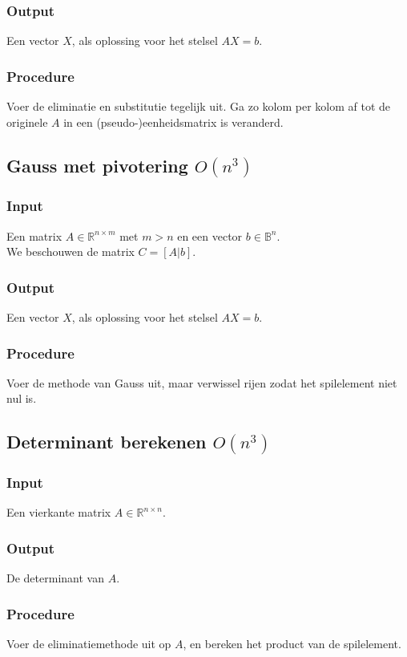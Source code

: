 \documentclass[samenvatting.tex]{subfiles}
\begin{document}
\subsubsection*{Output}
Een vector $X$, als oplossing voor het stelsel $AX=b$.
\subsubsection*{Procedure}
Voer de eliminatie en substitutie tegelijk uit. Ga zo kolom per kolom af tot de originele $A$ in een (pseudo-)eenheidsmatrix is veranderd.

\subsection{Gauss met pivotering $O(n^3)$}
\subsubsection*{Input}
Een matrix $A \in \mathbb{R}^{n\times m}$ met $m>n$ en een vector $b \in \mathbb{B}^{n}$.\\
We beschouwen de matrix $C = [A|b]$.
\subsubsection*{Output}
Een vector $X$, als oplossing voor het stelsel $AX=b$.
\subsubsection*{Procedure}
Voer de methode van Gauss uit, maar verwissel rijen zodat het spilelement niet nul is.

\subsection{Determinant berekenen $O(n^3)$}
\subsubsection*{Input}
Een vierkante matrix $A\in\mathbb{R}^{n\times n}$.
\subsubsection*{Output}
De determinant van $A$.
\subsubsection*{Procedure}
Voer de eliminatiemethode uit op $A$, en bereken het product van de spilelement.
\end{document}
